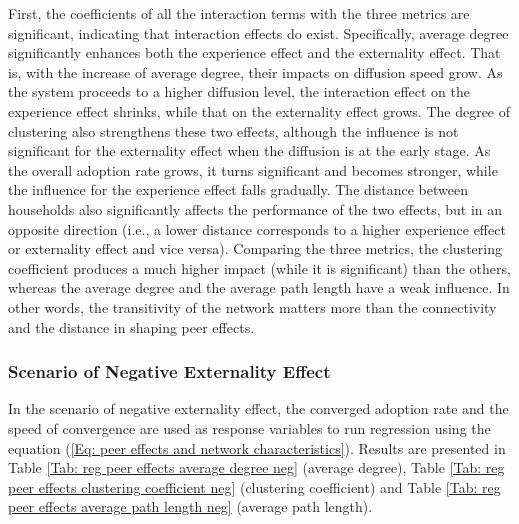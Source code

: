 \documentclass{bmcart}
\renewcommand{\tablename}{Table }
\begin{document}
First, the coefficients of all the interaction terms with the three metrics are significant, indicating that interaction effects do exist. Specifically, average degree significantly enhances both the experience effect and the externality effect. That is, with the increase of average degree, their impacts on diffusion speed grow. As the system proceeds to a higher diffusion level, the interaction effect on the experience effect shrinks, while that on the externality effect grows. The degree of clustering also strengthens these two effects, although the influence is not significant for the externality effect when the diffusion is at the early stage. As the overall adoption rate grows, it turns significant and becomes stronger, while the influence for the experience effect falls gradually. The distance between households also significantly affects the performance of the two effects, but in an opposite direction (i.e., a lower distance corresponds to a higher experience effect or externality effect and vice versa). Comparing the three metrics, the clustering coefficient produces a much higher impact (while it is significant) than the others, whereas the average degree and the average path length have a weak influence. In other words, the transitivity of the network matters more than the connectivity and the distance in shaping peer effects.

\subsubsection*{Scenario of Negative Externality Effect}
In the scenario of negative externality effect, the converged adoption rate and the speed of convergence are used as response variables to run regression using the equation (\ref{Eq: peer effects and network characteristics}). Results are presented in \tablename \ref{Tab: reg peer effects average degree neg} (average degree), \tablename \ref{Tab: reg peer effects clustering coefficient neg} (clustering coefficient) and \tablename \ref{Tab: reg peer effects average path length neg} (average path length). 
\end{document}

